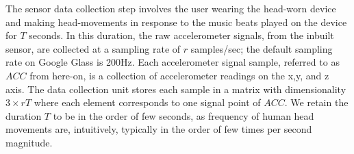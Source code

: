The sensor data collection step involves the user wearing
the head-worn device and making head-movements in response to
the music beats played on the device for $T$ seconds.
In this duration, the raw accelerometer
signals, from the inbuilt sensor, are collected at
a sampling rate of $r$ samples/sec; the default sampling rate on
Google Glass is 200Hz. Each accelerometer signal sample, referred
to as $ACC$ from here-on, is a collection of accelerometer readings on the
x,y, and z axis. The data collection unit stores each sample in a
matrix with dimensionality $3\times rT$ where each element corresponds
to one signal point of $ACC$. We retain the duration $T$ to be
in the order of few seconds, as frequency of human head
movements are, intuitively, typically in the order of few times per second
magnitude.

